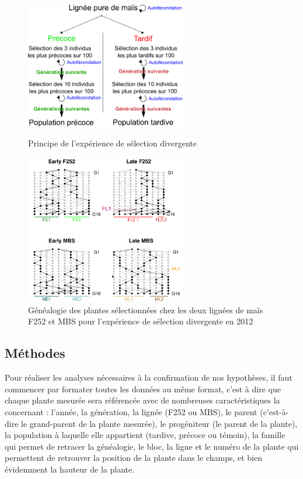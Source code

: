 \documentclass[12pt,a4paper]{article}
\begin{document}
			 			\begin{figure}[h]
			 				
			 				\begin{minipage}[t]{0.45\textwidth}
			 					\centering
			 					\includegraphics[width=7cm]{selec_div.png} %
			 					\caption{Principe de l'expérience de sélection divergente}
			 					\label{selec.div}
			 				\end{minipage}
			 				\quad
			 				\begin{minipage}[t]{0.45\textwidth}
			 					\centering
			 					\includegraphics[width=7cm]{carte_gen.png} %
			 					\caption{Généalogie des plantes sélectionnées chez les deux lignées de maïs F252 et MBS pour l'expérience de sélection divergente en 2012}
			 					\label{carte_gen}
			 					
			 				\end{minipage}
			 					
			 
			 
			 				
			 			\end{figure}
			 			
			 		\subsection{Méthodes}
			 			
			 			Pour réaliser les analyses nécessaires à la confirmation de nos hypothèses, il faut commencer par formater toutes les données au même format, c'est à dire que chaque plante mesurée sera référencée avec de nombreuses caractéristiques la concernant : l'année, la génération, la lignée (F252 ou MBS), le parent (c'est-à-dire le \og grand-parent \fg de la plante mesurée), le progéniteur (le parent de la plante), la population à laquelle elle appartient (tardive, précoce ou témoin), la famille qui permet de retracer la généalogie, le bloc, la ligne et le numéro de la plante qui permettent de retrouver la position de la plante dans le champs, et bien évidemment la hauteur de la plante.
			 			
\end{document}
